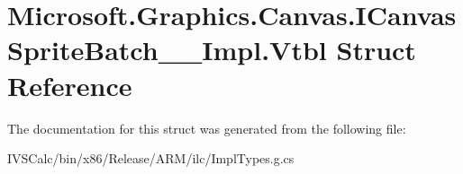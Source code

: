 \hypertarget{struct_microsoft_1_1_graphics_1_1_canvas_1_1_i_canvas_sprite_batch_____impl_1_1_vtbl}{}\section{Microsoft.\+Graphics.\+Canvas.\+I\+Canvas\+Sprite\+Batch\+\_\+\+\_\+\+Impl.\+Vtbl Struct Reference}
\label{struct_microsoft_1_1_graphics_1_1_canvas_1_1_i_canvas_sprite_batch_____impl_1_1_vtbl}


The documentation for this struct was generated from the following file\+:\begin{DoxyCompactItemize}
\item 
I\+V\+S\+Calc/bin/x86/\+Release/\+A\+R\+M/ilc/Impl\+Types.\+g.\+cs\end{DoxyCompactItemize}
